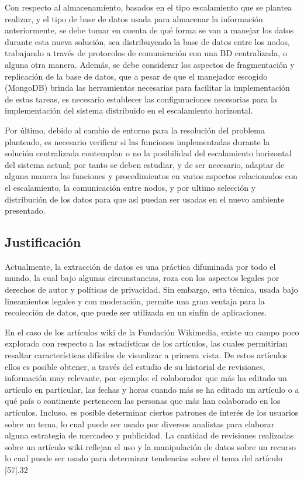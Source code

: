 Con respecto al almacenamiento, basados en el tipo escalamiento que se plantea
realizar, y el tipo de base de datos usada para almacenar la información anteriormente,
se debe tomar en cuenta de qué forma se van a manejar los datos durante esta nueva
solución, sea distribuyendo la base de datos entre los nodos, trabajando a través de
protocolos de comunicación con una BD centralizada, o alguna otra manera. Además, se
debe considerar los aspectos de fragmentación y replicación de la base de datos, que a
pesar de que el manejador escogido (MongoDB) brinda las herramientas necesarias
para facilitar la implementación de estas tareas, es necesario establecer las
configuraciones necesarias para la implementación del sistema distribuido en el
escalamiento horizontal.

Por último, debido al cambio de entorno para la resolución del problema planteado,
es necesario verificar si las funciones implementadas durante la solución centralizada
contemplan o no la posibilidad del escalamiento horizontal del sistema actual; por tanto
se deben estudiar, y de ser necesario, adaptar de alguna manera las funciones y
procedimientos en varios aspectos relacionados con el escalamiento, la comunicación
entre nodos, y por ultimo selección y distribución de los datos para que así puedan ser
usadas en el nuevo ambiente presentado.

\subsection{Justificación}

Actualmente, la extracción de datos es una práctica difuminada por todo el mundo, la
cual bajo algunas circunstancias, roza con los aspectos legales por derechos de autor y
políticas de privacidad. Sin embargo, esta técnica, usada bajo lineamientos legales y con
moderación, permite una gran ventaja para la recolección de datos, que puede ser
utilizada en un sinfín de aplicaciones.

En el caso de los artículos wiki de la Fundación Wikimedia, existe un campo poco
explorado con respecto a las estadísticas de los artículos, las cuales permitirían resaltar
características difíciles de visualizar a primera vista. De estos artículos ellos es posible
obtener, a través del estudio de su historial de revisiones, información muy relevante,
por ejemplo: el colaborador que más ha editado un artículo en particular, las fechas y
horas cuando más se ha editado un artículo o a qué país o continente pertenecen las
personas que más han colaborado en los artículos. Incluso, es posible determinar ciertos
patrones de interés de los usuarios sobre un tema, lo cual puede ser usado por diversos
analistas para elaborar alguna estrategia de mercadeo y publicidad. La cantidad de
revisiones realizadas sobre un artículo wiki reflejan el uso y la manipulación de datos
sobre un recurso lo cual puede ser usado para determinar tendencias sobre el tema del
artículo [57].32

